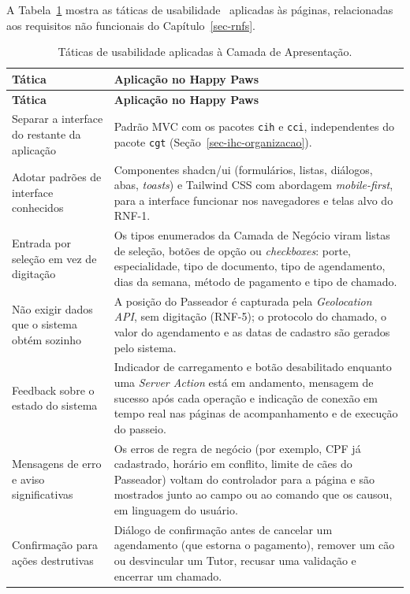 A Tabela~\ref{tabela-taticas-usabilidade} mostra as táticas de usabilidade~\cite{falbo:notas18} aplicadas às páginas, relacionadas aos requisitos não funcionais do Capítulo~\ref{sec-rnfs}.

\begin{footnotesize}
\setlength{\tabcolsep}{4pt}
\begin{longtable}{|p{4.2cm}|p{10.2cm}|}
	\caption{Táticas de usabilidade aplicadas à Camada de Apresentação.}
	\label{tabela-taticas-usabilidade}\\\hline
	\rowcolor{lightgray}
	\textbf{Tática} & \textbf{Aplicação no Happy Paws} \\\hline
	\endfirsthead
	\hline
	\rowcolor{lightgray}
	\textbf{Tática} & \textbf{Aplicação no Happy Paws} \\\hline
	\endhead
	Separar a interface do restante da aplicação & Padrão MVC com os pacotes \texttt{cih} e \texttt{cci}, independentes do pacote \texttt{cgt} (Seção~\ref{sec-ihc-organizacao}). \\\hline
	Adotar padrões de interface conhecidos & Componentes shadcn/ui (formulários, listas, diálogos, abas, \textit{toasts}) e Tailwind CSS com abordagem \textit{mobile-first}, para a interface funcionar nos navegadores e telas alvo do RNF-1. \\\hline
	Entrada por seleção em vez de digitação & Os tipos enumerados da Camada de Negócio viram listas de seleção, botões de opção ou \textit{checkboxes}: porte, especialidade, tipo de documento, tipo de agendamento, dias da semana, método de pagamento e tipo de chamado. \\\hline
	Não exigir dados que o sistema obtém sozinho & A posição do Passeador é capturada pela \textit{Geolocation API}, sem digitação (RNF-5); o protocolo do chamado, o valor do agendamento e as datas de cadastro são gerados pelo sistema. \\\hline
	Feedback sobre o estado do sistema & Indicador de carregamento e botão desabilitado enquanto uma \textit{Server Action} está em andamento, mensagem de sucesso após cada operação e indicação de conexão em tempo real nas páginas de acompanhamento e de execução do passeio. \\\hline
	Mensagens de erro e aviso significativas & Os erros de regra de negócio (por exemplo, CPF já cadastrado, horário em conflito, limite de cães do Passeador) voltam do controlador para a página e são mostrados junto ao campo ou ao comando que os causou, em linguagem do usuário. \\\hline
	Confirmação para ações destrutivas & Diálogo de confirmação antes de cancelar um agendamento (que estorna o pagamento), remover um cão ou desvincular um Tutor, recusar uma validação e encerrar um chamado. \\\hline

\end{longtable}
\end{footnotesize}
